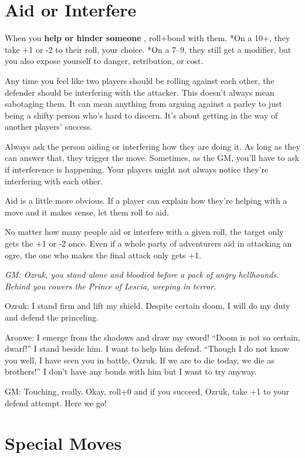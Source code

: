 \section*{Aid or Interfere}
\HRule
 When you \textbf{help or hinder someone }
, roll+bond with them. *On a 10+, they take +1 or -2 to their roll, your choice. *On a 7--9, they still get a modifier, but you also expose yourself to danger, retribution, or cost.
\HRule

 Any time you feel like two players should be rolling against each other, the defender should be interfering with the attacker. This doesn't always mean sabotaging them. It can mean anything from arguing against a parley to just being a shifty person who's hard to discern. It's about getting in the way of another players' success.


 Always ask the person aiding or interfering how they are doing it. As long as they can answer that, they trigger the move. Sometimes, as the GM, you'll have to ask if interference is happening. Your players might not always notice they're interfering with each other.


 Aid is a little more obvious. If a player can explain how they're helping with a move and it makes sense, let them roll to aid.


 No matter how many people aid or interfere with a given roll, the target only gets the +1 or -2 once. Even if a whole party of adventurers aid in attacking an ogre, the one who makes the final attack only gets +1.


{\itshape
 GM: Ozruk, you stand alone and bloodied before a pack of angry hellhounds. Behind you cowers the Prince of Lescia, weeping in terror.


 Ozruk: I stand firm and lift my shield. Despite certain doom, I will do my duty and defend the princeling.


 Aronwe: I emerge from the shadows and draw my sword! ``Doom is not so certain, dwarf!'' I stand beside him. I want to help him defend. ``Though I do not know you well, I have seen you in battle, Ozruk. If we are to die today, we die as brothers!'' I don't have any bonds with him but I want to try anyway.


 GM: Touching, really. Okay, roll+0 and if you succeed, Ozruk, take +1 to your defend attempt. Here we go!
}
\section*{Special Moves}


